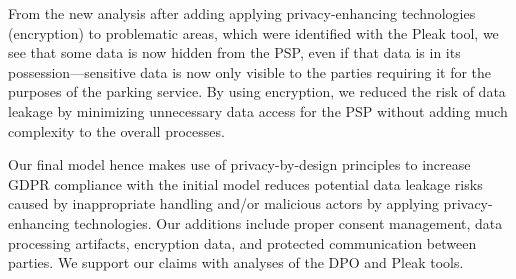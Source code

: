 From the new analysis after adding applying privacy-enhancing technologies (encryption) to problematic areas, which were
identified with the Pleak tool, we see that some data is now hidden from the PSP, even if
that data is in its possession---sensitive data is now only visible to the
parties requiring it for the purposes of the parking service. By using
encryption, we reduced the risk of data leakage by minimizing unnecessary data
access for the PSP without adding much complexity to the overall processes.

Our final model hence makes use of privacy-by-design principles to increase
GDPR compliance with the initial model reduces potential data leakage risks
caused by inappropriate handling and/or malicious actors by applying privacy-enhancing technologies. Our additions include
proper consent management, data processing artifacts, encryption data, and
protected communication between parties. We support our claims with analyses
of the DPO and Pleak tools.
